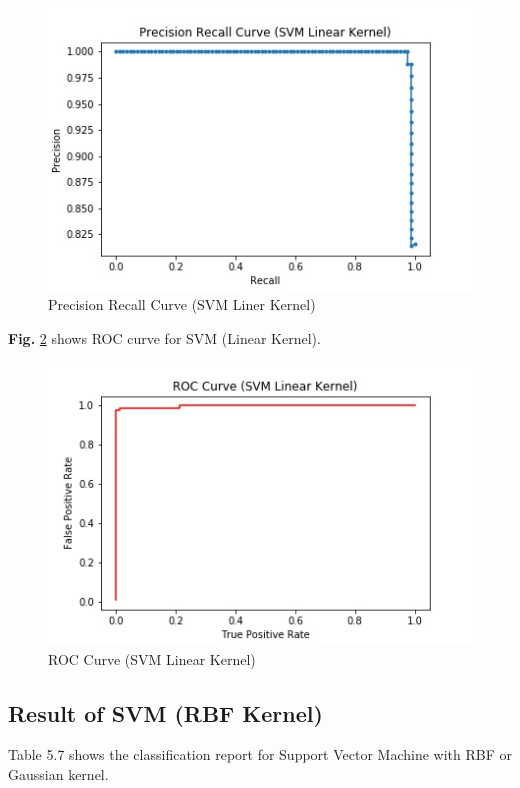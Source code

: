 \begin{figure}[h!]
    \centering
    \includegraphics[scale=0.58]{Figures/PRSL.jpg}
    \caption{Precision Recall Curve (SVM Liner Kernel)}
    \label{fig:prsl}
\end{figure}

\noindent
\textbf{Fig.} \ref{fig:rocsl} shows ROC curve for SVM (Linear Kernel).

\begin{figure}[h!]
    \centering
    \includegraphics[scale=0.58]{Figures/ROCSL.jpg}
    \caption{ROC Curve (SVM Linear Kernel)}
    \label{fig:rocsl}
\end{figure}


\subsection{Result of SVM (RBF Kernel)}
Table 5.7 shows the classification report for Support Vector Machine with RBF or Gaussian kernel.

